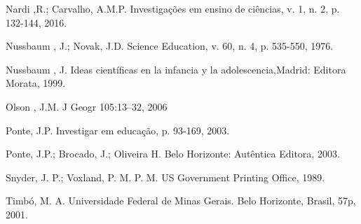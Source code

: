 \begin{multicols}{2}
\begin{thebibliography}{10}
   Nardi ,R.; Carvalho, A.M.P.  
  \newblock Investigações em ensino de ciências, v. 1, n. 2, p. 132-144, 2016.


  Nussbaum , J.; Novak, J.D.  
  \newblock Science Education, v. 60, n. 4, p. 535-550, 1976.

  Nussbaum , J.  
  \newblock Ideas científicas en la infancia y la adolescencia,Madrid: Editora Morata, 1999. 
  


  Olson , J.M.  
  \newblock J Geogr 105:13–32, 2006


    Ponte, J.P.
  \newblock Investigar em educação, p. 93-169, 2003.
  

    Ponte, J.P.; Brocado, J.; Oliveira H.
  \newblock Belo Horizonte: Autêntica Editora, 2003.


  Snyder, J. P.; Voxland, P. M.  
  \newblock P. M.  US Government Printing Office, 1989.
 

 Timbó, M. A.
  \newblock  Universidade Federal de Minas Gerais. Belo Horizonte, Brasil, 57p, 2001.




\end{thebibliography}
\end{multicols}
\endgroup